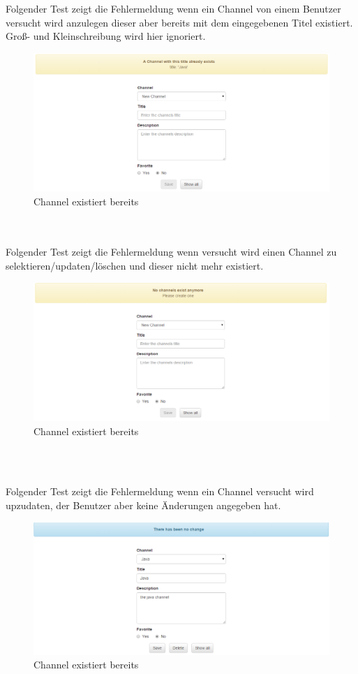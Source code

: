 \documentclass[11pt, a4paper, twoside]{article}   	%
\begin{document}
Folgender Test zeigt die Fehlermeldung wenn ein Channel von einem Benutzer versucht wird anzulegen dieser aber bereits mit dem eingegebenen Titel existiert. Groß- und Kleinschreibung wird hier ignoriert.
\begin{figure}[h]
	\centering
	\includegraphics[scale=0.5]{images/start_new_channel_already_existing.PNG}
	\caption
	{Channel existiert bereits}
\end{figure}\\\\

Folgender Test zeigt die Fehlermeldung wenn versucht wird einen Channel zu selektieren/updaten/löschen und dieser nicht mehr existiert.
\begin{figure}[h]
	\centering
	\includegraphics[scale=0.5]{images/start_new_channel_already_deleted.PNG}
	\caption
	{Channel existiert bereits}
\end{figure}\\\\
\newpage

Folgender Test zeigt die Fehlermeldung wenn ein Channel versucht wird upzudaten, der Benutzer aber keine Änderungen angegeben hat.
\begin{figure}[h]
	\centering
	\includegraphics[scale=0.5]{images/start_new_channel_no_change.PNG}
	\caption
	{Channel existiert bereits}
\end{figure}\\\\
\end{document}
